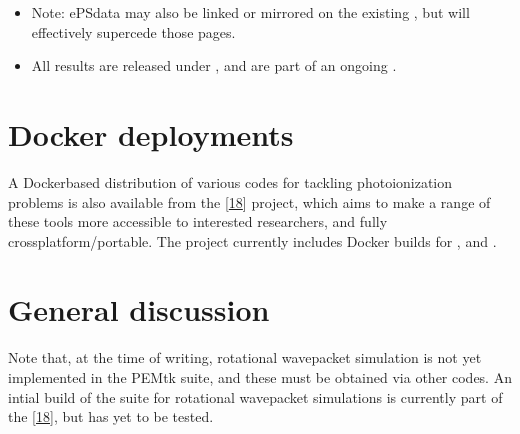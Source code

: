 \documentclass[letterpaper,10pt,english]{jupyterBook}
\begin{document}
\begin{itemize}
\begin{itemize}
\item {} 
\sphinxAtStartPar
Note: ePSdata may also be linked or mirrored on the existing , but will effectively supercede those pages.

\item {} 
\sphinxAtStartPar
All results are released under , and are part of an ongoing .

\end{itemize}

\end{itemize}


\section{Docker deployments}
\label{\detokenize{part1/platform_intro_071122:docker-deployments}}\label{\detokenize{part1/platform_intro_071122:sect-platform-docker}}
\sphinxAtStartPar
A Docker\sphinxhyphen{}based distribution of various codes for tackling
photoionization problems is also available from the  {[}\hyperlink{cite.backmatter/bibliography:id59}{18}{]}
project, which aims to make a range of these tools more accessible to
interested researchers, and fully cross\sphinxhyphen{}platform/portable. The project currently includes Docker builds for ,  and .


\section{General discussion}
\label{\detokenize{part1/platform_intro_071122:general-discussion}}\label{\detokenize{part1/platform_intro_071122:sect-platform-general}}
\sphinxAtStartPar
Note that, at the time of writing, rotational wavepacket simulation is
not yet implemented in the PEMtk suite, and these must be obtained via
other codes. An intial build of the  suite for rotational wavepacket simulations is currently part of the  {[}\hyperlink{cite.backmatter/bibliography:id59}{18}{]}, but has yet to be tested.
\end{document}
